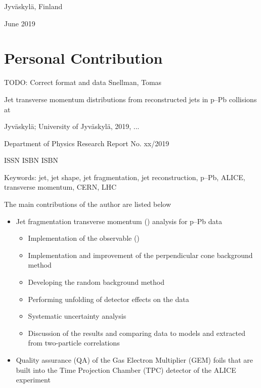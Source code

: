 \centerline{Jyv\"askyl\"a, Finland}
\centerline{June 2019}
\pagebreak
\thispagestyle{empty}
\section*{Personal Contribution} 
{\color{red} TODO: Correct format and data}
Snellman, Tomas

Jet transverse momentum distributions from reconstructed jets in p--Pb collisions at 


Jyväskylä; University of Jyväskylä, 2019, ...

Department of Physics Research Report No. xx/2019

ISSN
ISBN
ISBN

Keywords: jet, jet shape, jet fragmentation, jet reconstruction, p--Pb, ALICE,  transverse momentum, CERN, LHC

The main contributions of the author are listed below

\begin{itemize}
\item Jet fragmentation transverse momentum (\jt{}) analysis for   p--Pb data
\begin{itemize}
\item Implementation of the observable (\jt{})
\item Implementation and improvement of the perpendicular cone background method
\item Developing the random background method
\item Performing unfolding of detector effects on the data
\item Systematic uncertainty analysis
\item Discussion of the results and comparing data to models and \jt{} extracted from two-particle correlations
\end{itemize}
\item Quality assurance (QA) of the Gas Electron Multiplier (GEM) foils that are built into the Time Projection Chamber (TPC) detector of the ALICE experiment
\end{itemize} 


\pagebreak
\thispagestyle{empty}

\vspace*{25mm} 

